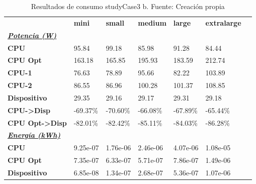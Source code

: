 \begin{table}[H]
    \centering
    \begin{tabular}{lllllll}
    \rowcolor[HTML]{DAE8FC} \ & \textbf{mini} & \textbf{small} & \textbf{medium} & \textbf{	large} & \textbf{	extralarge} \\
    \cellcolor[HTML]{DAE8FC} \textbf{\textbf{{\emph{{\underline{{Potencia (W)}}}}}}} &  &  &  & 	 & 	 \\
    \rowcolor[HTML]{EFEFEF} \cellcolor[HTML]{DAE8FC} \textbf{CPU} & 95.84 & 99.18 & 85.98 & 	91.28 & 	84.44 \\
    \cellcolor[HTML]{DAE8FC} \textbf{CPU Opt} & 163.18 & 165.85 & 195.93 & 	183.59 & 	212.74 \\
    \rowcolor[HTML]{EFEFEF} \cellcolor[HTML]{DAE8FC} \textbf{\quad CPU-1} & 76.63 & 78.89 & 95.66 & 	82.22 & 	103.89 \\
    \cellcolor[HTML]{DAE8FC} \textbf{\quad CPU-2} & 86.55 & 86.96 & 100.28 & 	101.37 & 	108.85 \\
    \rowcolor[HTML]{EFEFEF} \cellcolor[HTML]{DAE8FC} \textbf{Dispositivo} & 29.35 & 29.16 & 29.17 & 	29.31 & 	29.18 \\
    \cellcolor[HTML]{DAE8FC} \textbf{CPU->Disp} & -69.37\% & -70.60\% & -66.08\% & 	-67.89\% & 	-65.44\% \\
    \rowcolor[HTML]{EFEFEF} \cellcolor[HTML]{DAE8FC} \textbf{CPU Opt->Disp} & -82.01\% & -82.42\% & -85.11\% & 	-84.03\% & 	-86.28\% \\
    \cellcolor[HTML]{DAE8FC} \textbf{\textbf{{\emph{{\underline{{Energía (kWh)}}}}}}} &  &  &  & 	 & 	 \\
    \rowcolor[HTML]{EFEFEF} \cellcolor[HTML]{DAE8FC} \textbf{CPU} & 9.25e-07 & 1.76e-06 & 2.46e-06 & 	4.07e-06 & 	1.08e-05 \\
    \cellcolor[HTML]{DAE8FC} \textbf{CPU Opt} & 7.35e-07 & 6.33e-07 & 5.71e-07 & 	7.86e-07 & 	1.49e-06 \\
    \rowcolor[HTML]{EFEFEF} \cellcolor[HTML]{DAE8FC} \textbf{Dispositivo} & 6.85e-08 & 1.34e-07 & 2.68e-07 & 	5.36e-07 & 	1.07e-06 \\
    \end{tabular}
    \caption[Resultados de consumo studyCase3 b]{{Resultados de consumo studyCase3 b. Fuente: Creación propia}}
    \label{table_test_studyCase3_b_hw_powerResults}
\end{table}
